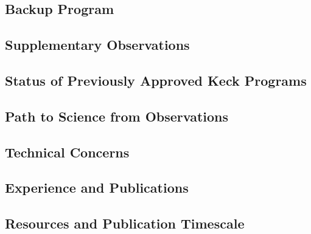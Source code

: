 \documentclass[11pt,preprint]{aastex}
\begin{document}
\subsection{Backup Program}

\subsection{Supplementary Observations}

\subsection{Status of Previously Approved Keck Programs}



\subsection{Path to Science from Observations}

\subsection{Technical Concerns}

\subsection{Experience and Publications}

\subsection{Resources and Publication Timescale}
\end{document}
